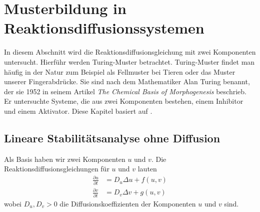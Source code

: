 %
%
%
%
\section{Musterbildung in Reaktionsdiffusionssystemen
\label{reaktdiff:section:teil1}}
In diesem Abschnitt wird die Reaktionsdiffusionsgleichung mit zwei Komponenten
untersucht.
Hierführ werden Turing-Muster betrachtet.
Turing-Muster findet man häufig in der Natur zum Beispiel als Fellmuster bei Tieren oder  das Muster unserer Fingerabdrücke.
Sie sind nach dem Mathematiker Alan Turing benannt, der sie 1952 in seinem Artikel \textit{The Chemical Basis of Morphogenesis} beschrieb.
Er untersuchte Systeme, die aus zwei Komponenten bestehen, einem Inhibitor und einem Aktivator.
Diese Kapitel basiert auf \cite{reaktdiff:be150_turing_patterns}\cite{reaktdiff:hoyle2006pattern}.

\subsection{Lineare Stabilitätsanalyse ohne Diffusion
\label{reaktdiff:subsection:mathe}}
Als Basis haben wir zwei Komponenten \(u\) und \(v\).
Die Reaktionsdiffusionsgleichungen für \(u\) und \(v\) lauten
\begin{align}
    \label{reaktdiff:equation:reaktdiff2}
    \frac{\partial u}{\partial t} &= D_u \Delta u + f(u,v)\\
    \frac{\partial v}{\partial t} &= D_v \Delta v + g(u,v)
\end{align}
wobei \(D_u, D_v > 0\) die Diffusionskoeffizienten der Komponenten \(u\) und \(v\) sind.

